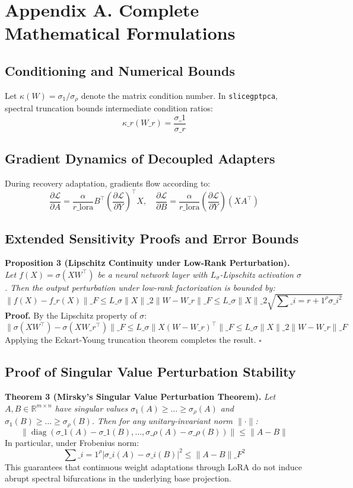 \section*{Appendix A. Complete Mathematical Formulations}

\subsection*{Conditioning and Numerical Bounds}
Let $\kappa(W) = \sigma_1 / \sigma_\rho$ denote the matrix condition number. In \texttt{slicegptpca}, spectral truncation bounds intermediate condition ratios:
\[
\kappa\_r(W\_r) = \frac{\sigma\_1}{\sigma\_r}
\]

\subsection*{Gradient Dynamics of Decoupled Adapters}
During recovery adaptation, gradients flow according to:
\[
\frac{\partial \mathcal{L}}{\partial A} = \frac{\alpha}{r\_{\text{lora}}} B^\top \left( \frac{\partial \mathcal{L}}{\partial Y} \right)^\top X, \quad \frac{\partial \mathcal{L}}{\partial B} = \frac{\alpha}{r\_{\text{lora}}} \left( \frac{\partial \mathcal{L}}{\partial Y} \right) (X A^\top)
\]

\subsection*{Extended Sensitivity Proofs and Error Bounds}
\textbf{Proposition 3 (Lipschitz Continuity under Low-Rank Perturbation).} \textit{Let $f(X) = \sigma(X W^\top)$ be a neural network layer with $L_\sigma$-Lipschitz activation $\sigma$. Then the output perturbation under low-rank factorization is bounded by:}
\[
\|f(X) - f\_r(X)\|\_F \le L\_\sigma \|X\|\_2 \|W - W\_r\|\_F \le L\_\sigma \|X\|\_2 \sqrt{\sum\_{i=r+1}^\rho \sigma\_i^2}
\]
\textbf{Proof.} By the Lipschitz property of $\sigma$:
\[
\|\sigma(X W^\top) - \sigma(X W\_r^\top)\|\_F \le L\_\sigma \|X (W - W\_r)^\top\|\_F \le L\_\sigma \|X\|\_2 \|W - W\_r\|\_F
\]
Applying the Eckart-Young truncation theorem completes the result. $\square$

\subsection*{Proof of Singular Value Perturbation Stability}
\textbf{Theorem 3 (Mirsky's Singular Value Perturbation Theorem).} \textit{Let $A, B \in \mathbb{R}^{m \times n}$ have singular values $\sigma_1(A) \ge \dots \ge \sigma_\rho(A)$ and $\sigma_1(B) \ge \dots \ge \sigma_\rho(B)$. Then for any unitary-invariant norm $\|\cdot\|$:}
\[
\left\| \operatorname{diag}(\sigma\_1(A) - \sigma\_1(B), \dots, \sigma\_\rho(A) - \sigma\_\rho(B)) \right\| \le \|A - B\|
\]
In particular, under Frobenius norm:
\[
\sum\_{i=1}^\rho |\sigma\_i(A) - \sigma\_i(B)|^2 \le \|A - B\|\_F^2
\]
This guarantees that continuous weight adaptations through LoRA do not induce abrupt spectral bifurcations in the underlying base projection.

